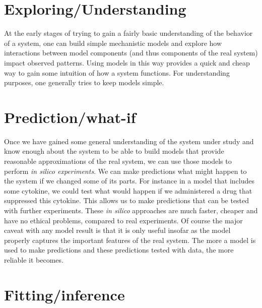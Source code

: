 \documentclass[]{book}
\theoremstyle{definition}
\theoremstyle{definition}
\theoremstyle{definition}
\theoremstyle{remark}
\begin{document}
\section{Exploring/Understanding}\label{exploringunderstanding}

At the early stages of trying to gain a fairly basic understanding of
the behavior of a system, one can build simple mechanistic models and
explore how interactions between model components (and thus components
of the real system) impact observed patterns. Using models in this way
provides a quick and cheap way to gain some intuition of how a system
functions. For understanding purposes, one generally tries to keep
models simple.

\section{Prediction/what-if}\label{predictionwhat-if}

Once we have gained some general understanding of the system under study
and know enough about the system to be able to build models that provide
reasonable approximations of the real system, we can use those models to
perform \emph{in silico experiments}. We can make predictions what might
happen to the system if we changed some of its parts. For instance in a
model that includes some cytokine, we could test what would happen if we
administered a drug that suppressed this cytokine. This allows us to
make predictions that can be tested with further experiments. These
\emph{in silico} approaches are much faster, cheaper and have no ethical
problems, compared to real experiments. Of course the major caveat with
any model result is that it is only useful insofar as the model properly
captures the important features of the real system. The more a model is
used to make predictions and these predictions tested with data, the
more reliable it becomes.

\section{Fitting/inference}\label{fittinginference}
\end{document}

